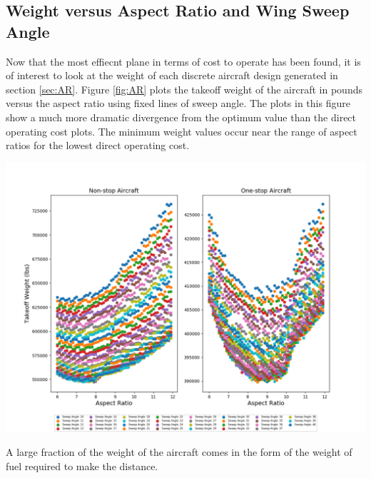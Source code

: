 \documentclass{article}
\begin{document}
    \subsection{Weight versus Aspect Ratio and Wing Sweep Angle}
    \label{sec:weight}
        \begin{flushleft}
            Now that the most effiecnt plane in terms of cost to operate has
            been found, it is of interest to look at the weight of each discrete
            aircraft design generated in section \ref{sec:AR}. Figure
            \ref{fig:AR} plots the takeoff weight of the aircraft in pounds
            versus the aspect ratio using fixed lines of sweep angle. The plots
            in this figure show a much more dramatic divergence from the optimum
            value than the direct operating cost plots. The minimum weight
            values occur near the range of aspect ratios for the lowest direct
            operating cost.
        \end{flushleft}

        \begin{center}
            \includegraphics[scale=0.5]{Weight v Sweep Angle.PNG}
            \label{fig:AR}
        \end{center}

        \begin{flushleft}
            A large fraction of the weight of the aircraft comes in the form of the weight of fuel required to make the distance.
        \end{flushleft}
\end{document}
